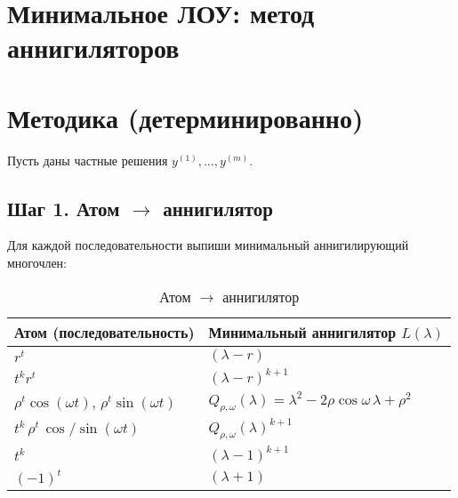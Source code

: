\section{Минимальное ЛОУ: метод аннигиляторов}\label{sec:min-lre}

\begin{center}
\end{center}

\section*{Методика (детерминированно)}

Пусть даны частные решения $y^{(1)},\ldots,y^{(m)}$.

\subsection*{Шаг 1. Атом $\to$ аннигилятор}
Для каждой последовательности выпиши минимальный аннигилирующий многочлен:
\begin{table}[h!]
\centering
\caption{Атом $\to$ аннигилятор}
\label{tab:atom-to-annihilator}
\begin{tabular}{|l|l|}
\hline
\textbf{Атом (последовательность)} & \textbf{Минимальный аннигилятор $L(\lambda)$} \\
\hline
$r^t$ & $(\lambda - r)$ \\
\hline
$t^k r^t$ & $(\lambda - r)^{k+1}$ \\
\hline
$\rho^t \cos(\omega t)$, $\rho^t \sin(\omega t)$ & $Q_{\rho,\omega}(\lambda)=\lambda^2-2\rho\cos\omega\,\lambda+\rho^2$ \\
\hline
$t^k \, \rho^t \, \cos/\sin(\omega t)$ & $Q_{\rho,\omega}(\lambda)^{k+1}$ \\
\hline
$t^k$ & $(\lambda-1)^{k+1}$ \\
\hline
$(-1)^t$ & $(\lambda+1)$ \\
\hline
\end{tabular}
\end{table}

